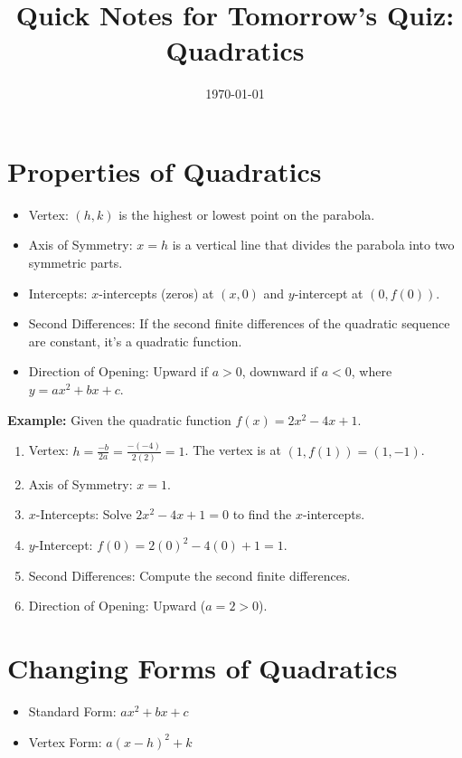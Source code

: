 \documentclass{article}
\title{Quick Notes for Tomorrow's Quiz: Quadratics}
\date{\today}
\begin{document}
\maketitle

\section{Properties of Quadratics}
\begin{itemize}
  \item Vertex: $(h, k)$ is the highest or lowest point on the parabola.
  \item Axis of Symmetry: $x = h$ is a vertical line that divides the parabola into two symmetric parts.
  \item Intercepts: $x$-intercepts (zeros) at $(x, 0)$ and $y$-intercept at $(0, f(0))$.
  \item Second Differences: If the second finite differences of the quadratic sequence are constant, it's a quadratic function.
  \item Direction of Opening: Upward if $a > 0$, downward if $a < 0$, where $y = ax^2 + bx + c$.
\end{itemize}

\textbf{Example:}
Given the quadratic function $f(x) = 2x^2 - 4x + 1$.
\begin{enumerate}
  \item Vertex: $h = \frac{-b}{2a} = \frac{-(-4)}{2(2)} = 1$. The vertex is at $(1, f(1)) = (1, -1)$.
  \item Axis of Symmetry: $x = 1$.
  \item $x$-Intercepts: Solve $2x^2 - 4x + 1 = 0$ to find the $x$-intercepts.
  \item $y$-Intercept: $f(0) = 2(0)^2 - 4(0) + 1 = 1$.
  \item Second Differences: Compute the second finite differences.
  \item Direction of Opening: Upward ($a = 2 > 0$).
\end{enumerate}

\section{Changing Forms of Quadratics}
\begin{itemize}
  \item Standard Form: $ax^2 + bx + c$
  \item Vertex Form: $a(x-h)^2 + k$
\end{itemize}
\end{document}

